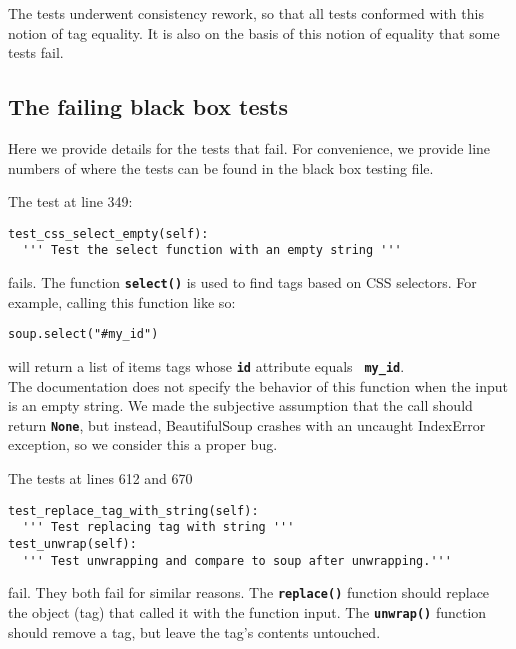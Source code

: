 \documentclass[10pt]{article}
\newcommand{\tbt}[1]{\texttt{\textbf{#1}}}
\begin{document}
The tests underwent consistency rework, so that all tests conformed with this notion of tag equality. It is also on the basis of this notion of equality that some tests fail. 

\subsection{The failing black box tests}

Here we provide details for the tests that fail. For convenience, we provide line numbers of where the tests can be found in the black box testing file. \\

\noindent\begin{minipage}{\textwidth}
\indent{\hspace{12pt}} The test at line 349:
\begin{lstlisting}[style = pythonstyle]
test_css_select_empty(self):
  ''' Test the select function with an empty string '''
\end{lstlisting}
\end{minipage}
fails. The function \tbt{select()} is used to find tags based on CSS selectors. For example, calling this function like so:
\begin{lstlisting}[style = pythonstyle]
soup.select("#my_id")
\end{lstlisting}
will return a list of items tags whose \tbt{id} attribute equals \tbt{\color{dark-green} my\_id}.  \\


The documentation does not specify the behavior of this function when the input is an empty string. We made the subjective assumption that the call should return \tbt{None}, but instead, BeautifulSoup crashes with an uncaught IndexError exception, so we consider this a proper bug. \\

\noindent\begin{minipage}{\textwidth}
\indent{\hspace{12pt}} The tests at lines 612 and 670
\begin{lstlisting}[style = pythonstyle]
test_replace_tag_with_string(self):
  ''' Test replacing tag with string '''
test_unwrap(self):
  ''' Test unwrapping and compare to soup after unwrapping.'''
\end{lstlisting}
\end{minipage}

fail. They both fail for similar reasons. The \tbt{replace()} function should replace the object (tag) that called it with the function input. The \tbt{unwrap()} function should remove a tag, but leave the tag's contents untouched. 
\end{document}
